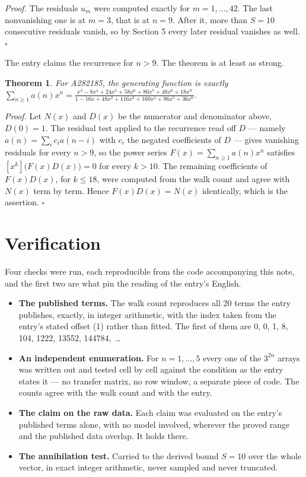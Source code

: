 \documentclass[11pt]{article}
\newtheorem{theorem}{Theorem}
\theoremstyle{definition}
\begin{document}
{\itshape Proof.} The residuals $u_m$ were computed exactly for $m = 1,\dots,42$. The last nonvanishing one is at $m = 3$, that is at $n = 9$. After it, more than $S = 10$ consecutive residuals vanish, so by Section 5 every later residual vanishes as well. $\square$

The entry claims the recurrence for $n > 9$. The theorem is at least as strong.

\begin{theorem} For A282185, the generating function is exactly $\sum_{n\ge 1} a(n)x^n = \frac{x^{3} - 8x^{4} + 24x^{5} + 58x^{6} + 80x^{7} + 48x^{8} + 18x^{9}}{1 - 16x + 48x^{2} + 116x^{3} + 160x^{4} + 96x^{5} + 36x^{6}}$.\end{theorem}

{\itshape Proof.} Let $N(x)$ and $D(x)$ be the numerator and denominator above, $D(0)=1$. The residual test applied to the recurrence read off $D$ --- namely $a(n) = \sum_i c_i a(n-i)$ with $c_i$ the negated coefficients of $D$ --- gives vanishing residuals for every $n > 9$, so the power series $F(x)=\sum_{n\ge 1}a(n)x^n$ satisfies $[x^k]\bigl(F(x)D(x)\bigr) = 0$ for every $k > 10$. The remaining coefficients of $F(x)D(x)$, for $k \le 18$, were computed from the walk count and agree with $N(x)$ term by term. Hence $F(x)D(x) = N(x)$ identically, which is the assertion. $\square$

\section{Verification}

Four checks were run, each reproducible from the code accompanying this note, and the first two are what pin the reading of the entry's English.

\begin{itemize}

\item {\bfseries The published terms.} The walk count reproduces all 20 terms the entry publishes, exactly, in integer arithmetic, with the index taken from the entry's stated offset (1) rather than fitted. The first of them are 0, 0, 1, 8, 104, 1222, 13552, 144784,~\dots

\item {\bfseries An independent enumeration.} For $n = 1,\dots,5$ every one of the $3^{2n}$ arrays was written out and tested cell by cell against the condition as the entry states it --- no transfer matrix, no row window, a separate piece of code. The counts agree with the walk count and with the entry.

\item {\bfseries The claim on the raw data.} Each claim was evaluated on the entry's published terms alone, with no model involved, wherever the proved range and the published data overlap. It holds there.

\item {\bfseries The annihilation test.} Carried to the derived bound $S = 10$ over the whole vector, in exact integer arithmetic, never sampled and never truncated.

\end{itemize}
\end{document}
